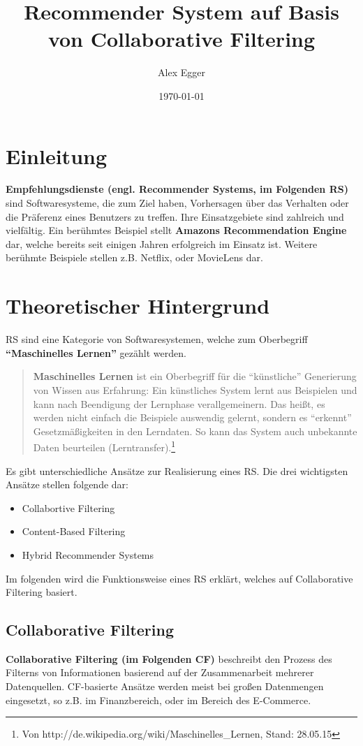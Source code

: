 \documentclass[german,a4paper]{article}
\title{Recommender System auf Basis von Collaborative Filtering}
\author{Alex Egger}
\date{\today}
\begin{document}
\maketitle
\newpage
\tableofcontents
\newpage

\section{Einleitung}
\textbf{Empfehlungsdienste (engl. Recommender Systems, im Folgenden RS)} sind Softwaresysteme, die zum Ziel haben, Vorhersagen über das Verhalten oder die Präferenz eines Benutzers zu treffen. Ihre Einsatzgebiete sind zahlreich und vielfältig. Ein berühmtes Beispiel stellt \textbf{Amazons Recommendation Engine} dar, welche bereits seit einigen Jahren erfolgreich im Einsatz ist. Weitere berühmte Beispiele stellen z.B. Netflix, oder MovieLens dar.
\section{Theoretischer Hintergrund}
RS sind eine Kategorie von Softwaresystemen, welche zum Oberbegriff \textbf{``Maschinelles Lernen''} gezählt werden.
\begin{quote}
\textbf{Maschinelles Lernen} ist ein Oberbegriff für die ``künstliche'' Generierung von Wissen aus Erfahrung: Ein künstliches System lernt aus Beispielen und kann nach Beendigung der Lernphase verallgemeinern. Das heißt, es werden nicht einfach die Beispiele auswendig gelernt, sondern es ``erkennt'' Gesetzmäßigkeiten in den Lerndaten. So kann das System auch unbekannte Daten beurteilen (Lerntransfer).\footnote{Von http://de.wikipedia.org/wiki/Maschinelles\_Lernen, Stand: 28.05.15}
\end{quote}
Es gibt unterschiedliche Ansätze zur Realisierung eines RS. Die drei wichtigsten Ansätze stellen folgende dar:
\begin{itemize}
\item Collabortive Filtering
\item Content-Based Filtering
\item Hybrid Recommender Systems
\end{itemize}
Im folgenden wird die Funktionsweise eines RS erklärt, welches auf Collaborative Filtering basiert.
\subsection{Collaborative Filtering}
\textbf{Collaborative Filtering (im Folgenden CF)} beschreibt den Prozess des Filterns von Informationen basierend auf der Zusammenarbeit mehrerer Datenquellen. CF-basierte Ansätze werden meist bei großen Datenmengen eingesetzt, so z.B. im Finanzbereich, oder im Bereich des E-Commerce. 
\end{document}

